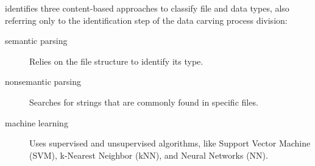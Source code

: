 \cite{beebe_sceadan:_2013} identifies three content-based approaches to classify file and data types, also referring only to the identification step of the \cite{ali_review_2018} data carving process division:
\begin{description}
    \item [semantic parsing] Relies on the file structure to identify its type.
    \item [nonsemantic parsing] Searches for strings that are commonly found in specific files.
    \item [machine learning] Uses supervised and unsupervised algorithms, like Support Vector Machine (SVM), k-Nearest Neighbor (kNN), and Neural Networks (NN).
\end{description}

